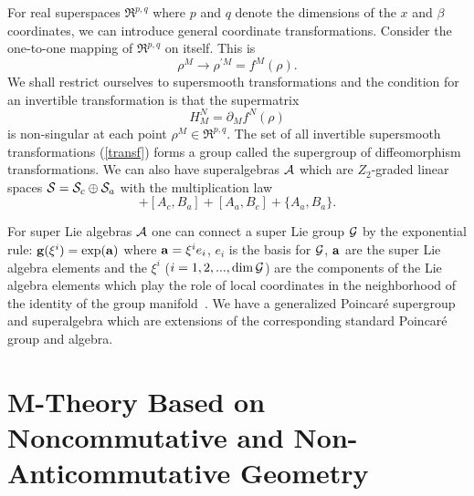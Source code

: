 \documentclass[a4paper,12pt]{article}
\begin{document}
For real superspaces $\Re^{p,q}$ where $p$ and $q$
denote the dimensions of the $x$ and $\beta$ coordinates, we can
introduce general coordinate transformations. Consider the
one-to-one mapping of $\Re^{p,q}$ on itself. This is
\begin{equation}
\rho^M\rightarrow\rho^{'M}=f^M(\rho).
\end{equation}
We shall restrict ourselves to supersmooth transformations and
the condition for an invertible transformation is that the
supermatrix
\begin{equation}
\label{transf}
H_M^N=\partial_Mf^N(\rho)
\end{equation}
is non-singular at each point $\rho^M\in \Re^{p,q}$. The set of
all invertible supersmooth transformations (\ref{transf}) forms
a group called the supergroup of diffeomorphism transformations.
We can also have superalgebras ${\cal A}$ which are
$Z_2$-graded linear spaces ${\cal S}={\cal S}_c\oplus {\cal
S}_a$ with the multiplication law
\begin{equation}
[A,B\}=A\cdot B-(-1)^{\epsilon(A)\epsilon(B)}B\cdot A,
\end{equation}
where $A$ and $B$ are arbitrary pure elements and $[...,...\}$
is the graded Lie superbracket. The super-Jacobi identities are
\begin{equation}
(-1)^{\epsilon(A)\epsilon(C)}[A,[B,C\}\}+(-1)^{\epsilon
(B)\epsilon(A)}[B,[C,A\}\}+(-1)^{\epsilon(C)\epsilon(B)}[C,[A,B\}\}=0.
\end{equation}
For arbitrary elements $A,B$ and $C$ we have
\begin{equation}
[A,B\}=[A_c,B_c]+[A_c,B_a]+[A_a,B_c]+\{A_a,B_a\}.
\end{equation}

For super Lie algebras ${\cal A}$ one can connect a super Lie
group ${\cal G}$ by the exponential rule: ${\bf
g}(\xi^i)=\exp({\bf a})$ where ${\bf a}=\xi^ie_i$, $e_i$ is
the basis for ${\cal G}$, ${\bf a}$ are the super Lie algebra
elements and the $\xi^i$ ($i=1,2,..., {\rm dim}\, {\cal G}$) are
the components of the Lie algebra elements which play the role of
local coordinates in the neighborhood of the identity of the
group manifold~\cite{Berezin}. We have a generalized Poincar\'e
supergroup and superalgebra which are extensions of the
corresponding standard Poincar\'e group and algebra.

\section{\bf M-Theory Based on Noncommutative and Non-Anticommutative Geometry}
\end{document}

